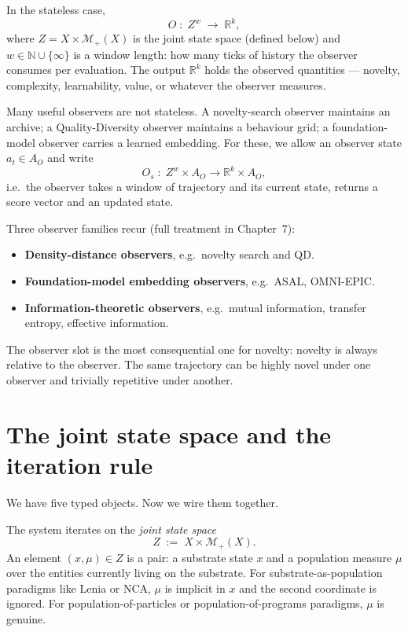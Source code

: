 In the stateless case,
\[
  O \;:\; Z^w \;\to\; \mathbb{R}^k,
\]
where $Z = X \times \mathcal{M}_+(X)$ is the joint state space (defined
below) and $w \in \mathbb{N} \cup \{\infty\}$ is a window length: how
many ticks of history the observer consumes per evaluation. The output
$\mathbb{R}^k$ holds the observed quantities --- novelty, complexity,
learnability, value, or whatever the observer measures.

Many useful observers are not stateless. A novelty-search observer
maintains an archive; a Quality-Diversity observer maintains a behaviour
grid; a foundation-model observer carries a learned embedding. For
these, we allow an observer state $a_t \in A_O$ and write
\[
  O_s \;:\; Z^w \times A_O \to \mathbb{R}^k \times A_O,
\]
i.e.\ the observer takes a window of trajectory and its current state,
returns a score vector and an updated state.

Three observer families recur (full treatment in Chapter~7):

\begin{itemize}[leftmargin=1.5em,itemsep=2pt]
  \item \textbf{Density-distance observers}, e.g.\ novelty search and
    QD.
  \item \textbf{Foundation-model embedding observers}, e.g.\ ASAL,
    OMNI-EPIC.
  \item \textbf{Information-theoretic observers}, e.g.\ mutual
    information, transfer entropy, effective information.
\end{itemize}

The observer slot is the most consequential one for novelty: novelty is
always relative to the observer. The same trajectory can be highly novel
under one observer and trivially repetitive under another.

\section{The joint state space and the iteration rule}

We have five typed objects. Now we wire them together.

The system iterates on the \emph{joint state space}
\[
  Z \;:=\; X \times \mathcal{M}_+(X).
\]
An element $(x, \mu) \in Z$ is a pair: a substrate state $x$ and a
population measure $\mu$ over the entities currently living on the
substrate. For substrate-as-population paradigms like Lenia or NCA,
$\mu$ is implicit in $x$ and the second coordinate is ignored. For
population-of-particles or population-of-programs paradigms, $\mu$ is
genuine.

